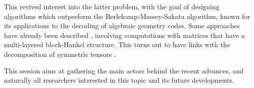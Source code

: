 \documentclass[12pt,english]{article}
\begin{document}
This revived interest into the latter problem, with the goal of designing
algorithms which outperform the Berlekamp-Massey-Sakata algorithm, known for
its applications to the decoding of algebraic geometry codes.  Some approaches
have already been described \cite{BerBoyFau17,Mourrain17}, involving
computations with matrices that have a multi-layered block-Hankel structure.
This turns out to have links with the decomposition of symmetric tensors
\cite{BrCoMots10}.

This session aims at gathering the main actors behind the recent advances, and
naturally all researchers interested in this topic and its future developments.






\end{document}
